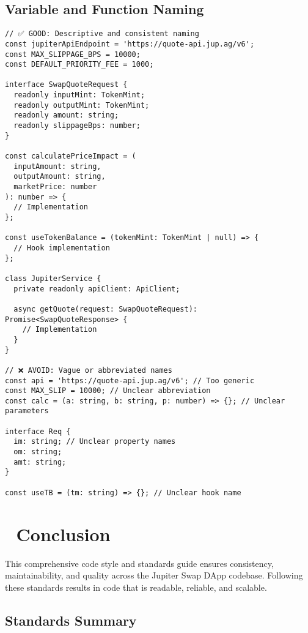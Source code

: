 \documentclass[11pt,a4paper]{article}
\begin{document}
\subsection{Variable and Function Naming}

\begin{lstlisting}[style=typescript, caption=Naming Convention Examples]
// ✅ GOOD: Descriptive and consistent naming
const jupiterApiEndpoint = 'https://quote-api.jup.ag/v6';
const MAX_SLIPPAGE_BPS = 10000;
const DEFAULT_PRIORITY_FEE = 1000;

interface SwapQuoteRequest {
  readonly inputMint: TokenMint;
  readonly outputMint: TokenMint;
  readonly amount: string;
  readonly slippageBps: number;
}

const calculatePriceImpact = (
  inputAmount: string,
  outputAmount: string,
  marketPrice: number
): number => {
  // Implementation
};

const useTokenBalance = (tokenMint: TokenMint | null) => {
  // Hook implementation
};

class JupiterService {
  private readonly apiClient: ApiClient;
  
  async getQuote(request: SwapQuoteRequest): Promise<SwapQuoteResponse> {
    // Implementation
  }
}

// ❌ AVOID: Vague or abbreviated names
const api = 'https://quote-api.jup.ag/v6'; // Too generic
const MAX_SLIP = 10000; // Unclear abbreviation
const calc = (a: string, b: string, p: number) => {}; // Unclear parameters

interface Req {
  im: string; // Unclear property names
  om: string;
  amt: string;
}

const useTB = (tm: string) => {}; // Unclear hook name
\end{lstlisting}

\section{🎯 Conclusion}

This comprehensive code style and standards guide ensures consistency, maintainability, and quality across the Jupiter Swap DApp codebase. Following these standards results in code that is readable, reliable, and scalable.

\subsection{Standards Summary}
\end{document}
